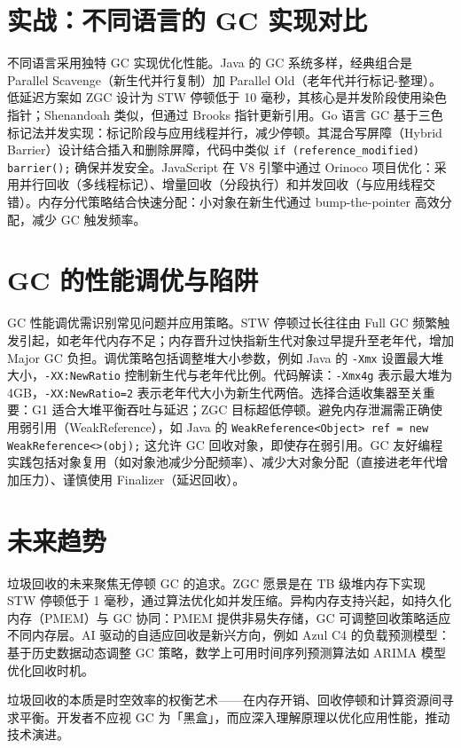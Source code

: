 \chapter{实战：不同语言的 GC 实现对比}
不同语言采用独特 GC 实现优化性能。Java 的 GC 系统多样，经典组合是 Parallel Scavenge（新生代并行复制）加 Parallel Old（老年代并行标记-整理）。低延迟方案如 ZGC 设计为 STW 停顿低于 10 毫秒，其核心是并发阶段使用染色指针；Shenandoah 类似，但通过 Brooks 指针更新引用。Go 语言 GC 基于三色标记法并发实现：标记阶段与应用线程并行，减少停顿。其混合写屏障（Hybrid Barrier）设计结合插入和删除屏障，代码中类似 \texttt{if (reference\_{}modified) barrier();} 确保并发安全。JavaScript 在 V8 引擎中通过 Orinoco 项目优化：采用并行回收（多线程标记）、增量回收（分段执行）和并发回收（与应用线程交错）。内存分代策略结合快速分配：小对象在新生代通过 bump-the-pointer 高效分配，减少 GC 触发频率。\par
\chapter{GC 的性能调优与陷阱}
GC 性能调优需识别常见问题并应用策略。STW 停顿过长往往由 Full GC 频繁触发引起，如老年代内存不足；内存晋升过快指新生代对象过早提升至老年代，增加 Major GC 负担。调优策略包括调整堆大小参数，例如 Java 的 \texttt{-Xmx} 设置最大堆大小，\texttt{-XX:NewRatio} 控制新生代与老年代比例。代码解读：\texttt{-Xmx4g} 表示最大堆为 4GB，\texttt{-XX:NewRatio=2} 表示老年代大小为新生代两倍。选择合适收集器至关重要：G1 适合大堆平衡吞吐与延迟；ZGC 目标超低停顿。避免内存泄漏需正确使用弱引用（WeakReference），如 Java 的 \texttt{WeakReference<Object> ref = new WeakReference<>(obj);} 这允许 GC 回收对象，即使存在弱引用。GC 友好编程实践包括对象复用（如对象池减少分配频率）、减少大对象分配（直接进老年代增加压力）、谨慎使用 Finalizer（延迟回收）。\par
\chapter{未来趋势}
垃圾回收的未来聚焦无停顿 GC 的追求。ZGC 愿景是在 TB 级堆内存下实现 STW 停顿低于 1 毫秒，通过算法优化如并发压缩。异构内存支持兴起，如持久化内存（PMEM）与 GC 协同：PMEM 提供非易失存储，GC 可调整回收策略适应不同内存层。AI 驱动的自适应回收是新兴方向，例如 Azul C4 的负载预测模型：基于历史数据动态调整 GC 策略，数学上可用时间序列预测算法如 ARIMA 模型优化回收时机。\par
垃圾回收的本质是时空效率的权衡艺术——在内存开销、回收停顿和计算资源间寻求平衡。开发者不应视 GC 为「黑盒」，而应深入理解原理以优化应用性能，推动技术演进。\par
